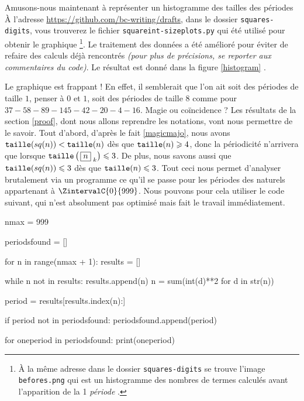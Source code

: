 \medskip

Amusons-nous maintenant à représenter un histogramme des tailles des \og périodes \fg{}
À l'adresse \url{https://github.com/bc-writing/drafts}, dans le dossier \texttt{squares-digits}, vous trouverez le fichier \texttt{squareint-sizeplots.py} qui été utilisé pour obtenir le graphique
\footnote{
    À la même adresse dans le dossier \texttt{squares-digits} se trouve l'image \texttt{befores.png} qui est un histogramme des nombres de termes calculés avant l'apparition de la 1\iere{} \emph{\og période \fg{}}.
}.
Le traitement des données a été amélioré pour éviter de refaire des calculs déjà rencontrés \emph{(pour plus de précisions, se reporter aux commentaires du code)}.
Le résultat est donné dans la figure \ref{histogram} .



\medskip

Le graphique est frappant ! En effet, il semblerait que l'on ait soit des périodes de taille $1$, penser à $0$ et $1$, soit des périodes de taille $8$ comme pour $37 - 58 - 89 - 145 - 42 - 20 - 4 - 16$.
Magie ou coïncidence ? Les résultats de la section \ref{proof}, dont nous allons reprendre les notations, vont nous permettre de le savoir.
Tout d'abord,  d'après le fait \ref{magicmajo}, nous avons $\operatorname{\text{\normalfont\texttt{taille}}}(sq(n)) < \operatorname{\text{\normalfont\texttt{taille}}}(n)$ dès que $\operatorname{\text{\normalfont\texttt{taille}}}(n) \geqslant 4$, donc la périodicité n'arrivera que lorsque $\operatorname{\text{\normalfont\texttt{taille}}}\left( \, \fbox{$n$}_{\,\,k} \right) \leqslant 3$.
De plus, nous savons aussi que $\operatorname{\text{\normalfont\texttt{taille}}}(sq(n)) \leqslant 3$ dès que $\operatorname{\text{\normalfont\texttt{taille}}}(n) \leqslant 3$.
Tout ceci nous permet d'analyser brutalement via un programme ce qu'il se passe pour les périodes des naturels appartenant à $\ZintervalC{0}{999}$. Nous pouvons pour cela utiliser le code suivant, qui n'est absolument pas optimisé mais fait le travail immédiatement.


\newpage

\begin{rawcode}
nmax = 999

periodsfound = []

for n in range(nmax + 1):
    results = []

    while n not in results:
        results.append(n)
        n = sum(int(d)**2 for d in str(n))

    period = results[results.index(n):]

    if period not in periodsfound:
        periodsfound.append(period)

for oneperiod in periodsfound:
    print(oneperiod)
\end{rawcode}



